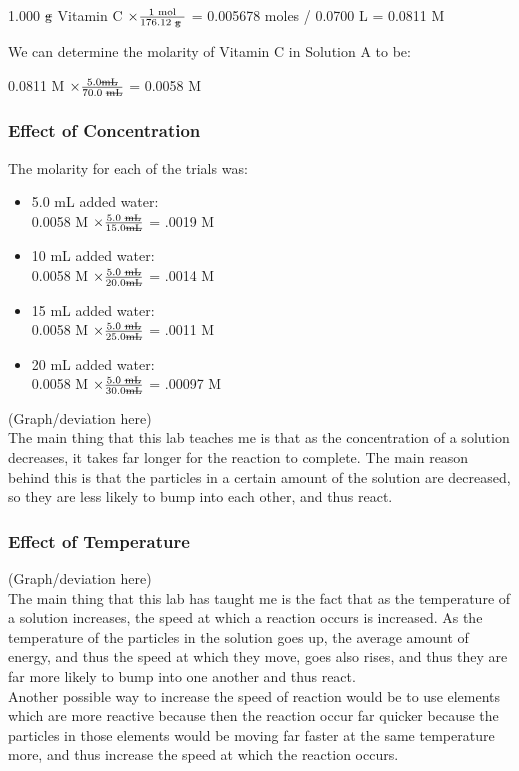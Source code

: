 \documentclass[11pt]{article}
\begin{document}
	1.000 $\textrm{\sout{g}}$ Vitamin C $\times \frac{\textrm{1 mol}}{\textrm{176.12 \sout{g} } }$ = 0.005678 moles / 0.0700 L = 0.0811 M
	
We can determine the molarity of Vitamin C in Solution A to be:

0.0811 M $\times \frac{\textrm{5.0\sout{mL}}}{\textrm{70.0 \sout{mL}}}$ = 0.0058 M
	
\subsubsection{Effect of Concentration}
The molarity for each of the trials was:

\begin {itemize}
\item 5.0 mL added water:\\
 0.0058 M $ \times \frac{\textrm{5.0 \sout{mL}}}{\textrm{15.0\sout{mL}}}$ = .0019 M
 \item 10 mL added water:\\
 0.0058 M $ \times \frac{\textrm{5.0 \sout{mL}}}{\textrm{20.0\sout{mL}}}$ = .0014 M
 \item 15 mL added water:\\
 0.0058 M $ \times \frac{\textrm{5.0 \sout{mL}}}{\textrm{25.0\sout{mL}}}$ = .0011 M
 \item 20 mL added water:\\
 0.0058 M $ \times \frac{\textrm{5.0 \sout{mL}}}{\textrm{30.0\sout{mL}}}$ = .00097 M
\end{itemize}
(Graph/deviation here)\\
The main thing that this lab teaches me is that as the concentration of a solution decreases, it takes far longer for the reaction to complete. The main reason behind this is that the particles in a certain amount of the solution are decreased, so they are less likely to bump into each other, and thus react. 

\subsubsection{Effect of Temperature}

(Graph/deviation here)\\
The main thing that this lab has taught me is the fact that as the temperature of a solution increases, the speed at which a reaction occurs is increased. As the temperature of the particles in the solution goes up, the average amount of energy, and thus the speed at which they move, goes also rises, and thus they are far more likely to bump into one another and thus react.\\
Another possible way to increase the speed of reaction would be to use elements which are more reactive because then the reaction occur far quicker because the particles in those elements would be moving far faster at the same temperature more, and thus increase the speed at which the reaction occurs.
\end{document}
